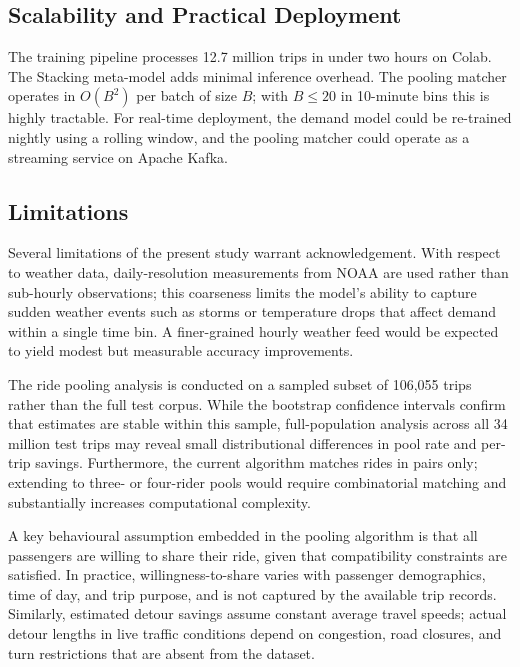 \documentclass[a4paper,fleqn]{cas-dc}
\begin{document}
\subsection{Scalability and Practical Deployment}

The training pipeline processes 12.7 million trips in under two hours on Colab.  The Stacking meta-model adds minimal inference overhead.  The pooling matcher operates in $O(B^2)$ per batch of size $B$; with $B \leq 20$ in 10-minute bins this is highly tractable.  For real-time deployment, the demand model could be re-trained nightly using a rolling window, and the pooling matcher could operate as a streaming service on Apache Kafka.

\subsection{Limitations}

Several limitations of the present study warrant acknowledgement.  With respect to weather data, daily-resolution measurements from NOAA are used rather than sub-hourly observations; this coarseness limits the model's ability to capture sudden weather events such as storms or temperature drops that affect demand within a single time bin.  A finer-grained hourly weather feed would be expected to yield modest but measurable accuracy improvements.

The ride pooling analysis is conducted on a sampled subset of 106,055 trips rather than the full test corpus.  While the bootstrap confidence intervals confirm that estimates are stable within this sample, full-population analysis across all 34 million test trips may reveal small distributional differences in pool rate and per-trip savings.  Furthermore, the current algorithm matches rides in pairs only; extending to three- or four-rider pools would require combinatorial matching and substantially increases computational complexity.

A key behavioural assumption embedded in the pooling algorithm is that all passengers are willing to share their ride, given that compatibility constraints are satisfied.  In practice, willingness-to-share varies with passenger demographics, time of day, and trip purpose, and is not captured by the available trip records.  Similarly, estimated detour savings assume constant average travel speeds; actual detour lengths in live traffic conditions depend on congestion, road closures, and turn restrictions that are absent from the dataset.
\end{document}
